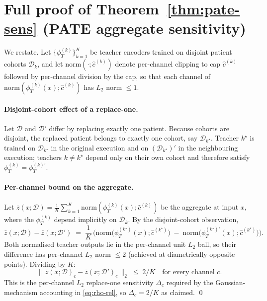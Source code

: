 \section{Full proof of Theorem~\ref{thm:pate-sens} (PATE aggregate sensitivity)}
\label{app:pate-proof}

We restate. Let $\{\phi_T^{(k)}\}_{k=1}^K$ be teacher encoders trained
on disjoint patient cohorts $\mathcal{D}_k$, and let
$\mathrm{norm}(\cdot;\widehat{c}^{(k)})$ denote per-channel clipping
to cap $\widehat{c}^{(k)}$ followed by per-channel division by the
cap, so that each channel of $\mathrm{norm}(\phi_T^{(k)}(x);
\widehat{c}^{(k)})$ has $L_2$ norm $\le 1$.

\paragraph{Disjoint-cohort effect of a replace-one.}
Let $\mathcal{D}$ and $\mathcal{D}'$ differ by replacing exactly one
patient. Because cohorts are disjoint, the replaced patient belongs to
exactly one cohort, say $\mathcal{D}_{k^\star}$. Teacher $k^\star$ is
trained on $\mathcal{D}_{k^\star}$ in the original execution and on
$(\mathcal{D}_{k^\star})'$ in the neighbouring execution; teachers
$k \ne k^\star$ depend only on their own cohort and therefore satisfy
$\phi_T^{(k)} = \phi_T^{(k)\prime}$.

\paragraph{Per-channel bound on the aggregate.}
Let $\bar z(x;\mathcal{D}) = \tfrac{1}{K}\sum_{k=1}^{K}
\mathrm{norm}(\phi_T^{(k)}(x); \widehat{c}^{(k)})$ be the aggregate at
input $x$, where the $\phi_T^{(k)}$ depend implicitly on
$\mathcal{D}_k$. By the disjoint-cohort observation,
\begin{equation*}
\bar z(x;\mathcal{D}) - \bar z(x;\mathcal{D}')
 \;=\; \frac{1}{K}\,\bigl(
   \mathrm{norm}\bigl(\phi_T^{(k^\star)}(x);\widehat{c}^{(k^\star)}\bigr)
 \;-\;
   \mathrm{norm}\bigl(\phi_T^{(k^\star)\prime}(x);\widehat{c}^{(k^\star)}\bigr)
 \bigr).
\end{equation*}
Both normalised teacher outputs lie in the per-channel unit $L_2$ ball,
so their difference has per-channel $L_2$ norm $\le 2$ (achieved at
diametrically opposite points). Dividing by $K$:
\begin{equation*}
\bigl\|\, \bar z(x;\mathcal{D})_c - \bar z(x;\mathcal{D}')_c \,\bigr\|_2
 \;\le\; 2/K \quad \text{for every channel } c.
\end{equation*}
This is the per-channel $L_2$ replace-one sensitivity $\Delta_c$
required by the Gaussian-mechanism accounting in \eqref{eq:rho-rel},
so $\Delta_c = 2/K$ as claimed. \qed

